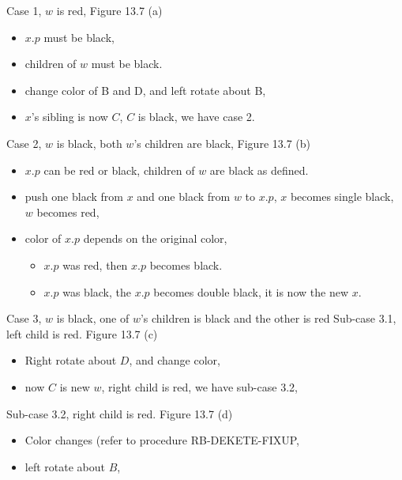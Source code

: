 \documentclass{beamer}
\begin{document}
\begin{frame}{Case 1, $w$ is red, Figure 13.7 (a)}

\begin{itemize}
\item $x.p$ must be black, 
\item children of $w$ must be black. 
\item change color of B and D, and left rotate about B,
\item $x$'s sibling is now $C$, $C$ is black, we have case 2.  
\end{itemize}
\end{frame}

%

\begin{frame}{Case 2, $w$ is black, both $w$'s children are black, Figure 13.7 (b)}

\begin{itemize}
\item $x.p$ can be red or black,  children of $w$ are black as defined. 
\item push one black from $x$ and one black from $w$ to $x.p$, $x$ becomes single black, $w$ becomes red,
\item color of $x.p$ depends on the original color, 
\begin{itemize}
\item $x.p$ was red, then $x.p$ becomes black. 
\item $x.p$ was black, the $x.p$ becomes double black, it is now the new $x$. 
\end{itemize}
\end{itemize}
\end{frame}

\begin{frame}{Case 3, $w$ is black, one of $w$'s children is black and the other is red}
Sub-case 3.1, left child is red. {\color{blue} Figure 13.7 (c)} 
\begin{itemize}
\item Right rotate about $D$, and change color,
\item now $C$ is new $w$, right child is red, we have sub-case 3.2,
\end{itemize}
\end{frame}

\begin{frame}{}

Sub-case 3.2, right child is red. {\color{blue} Figure 13.7 (d)}
\begin{itemize}
\item Color changes (refer to procedure {\sc RB-DEKETE-FIXUP},
\item  left rotate about $B$, 
\end{itemize} 
\end{frame}
\end{document}
